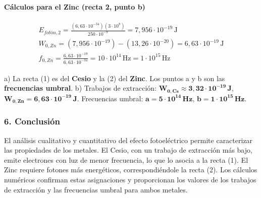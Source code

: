 \paragraph*{Cálculos para el Zinc (recta 2, punto b)}
\begin{gather}
    E_{fotón,2} = \frac{(6,63\cdot10^{-34})(3\cdot10^8)}{250\cdot10^{-9}} = 7,956\cdot10^{-19}\,\text{J} \\
    W_{0,Zn} = (7,956\cdot10^{-19}) - (13,26\cdot10^{-20}) = 6,63\cdot10^{-19}\,\text{J} \\
    f_{0,Zn} = \frac{6,63\cdot10^{-19}}{6,63\cdot10^{-34}} = 10\cdot10^{14}\,\text{Hz} = 1\cdot10^{15}\,\text{Hz}
\end{gather}
\begin{cajaresultado}
a) La recta (1) es del \textbf{Cesio} y la (2) del \textbf{Zinc}. Los puntos a y b son las \textbf{frecuencias umbral}.
b) Trabajos de extracción: $\boldsymbol{W_{0,Cs} \approx 3,32\cdot10^{-19}\,\textbf{J}}$, $\boldsymbol{W_{0,Zn} = 6,63\cdot10^{-19}\,\textbf{J}}$.
Frecuencias umbral: $\boldsymbol{a = 5\cdot10^{14}\,\textbf{Hz}}$, $\boldsymbol{b = 1\cdot10^{15}\,\textbf{Hz}}$.
\end{cajaresultado}

\subsubsection*{6. Conclusión}
\begin{cajaconclusion}
El análisis cualitativo y cuantitativo del efecto fotoeléctrico permite caracterizar las propiedades de los metales. El Cesio, con un trabajo de extracción más bajo, emite electrones con luz de menor frecuencia, lo que lo asocia a la recta (1). El Zinc requiere fotones más energéticos, correspondiéndole la recta (2). Los cálculos numéricos confirman estas asignaciones y proporcionan los valores de los trabajos de extracción y las frecuencias umbral para ambos metales.
\end{cajaconclusion}
\newpage